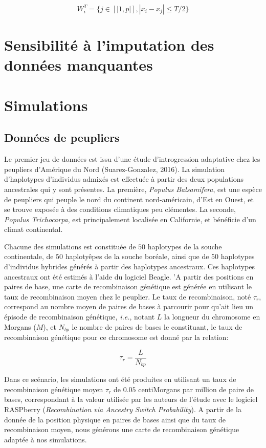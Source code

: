 \documentclass[12pt,twoside]{reedthesis}
\theoremstyle{definition}
\theoremstyle{definition}
\theoremstyle{remark}
\begin{document}
  \[W_i^T = \{ j \in [|1, p|], |x_i - x_j| \leq T/2 \}\]
  
  \section{Sensibilité à l'imputation des données
  manquantes}\label{sensibilite-a-limputation-des-donnees-manquantes}
  
  \section{Simulations}\label{simulations}
  
  \subsection{Données de peupliers}\label{donnees-de-peupliers}
  
  Le premier jeu de données est issu d'une étude d'introgression
  adaptative chez les peupliers d'Amérique du Nord (Suarez-Gonzalez,
  2016). La simulation d'haplotypes d'individus admixés est effectuée à
  partir des deux populations ancestrales qui y sont présentes. La
  première, \emph{Populus Balsamifera}, est une espèce de peupliers qui
  peuple le nord du continent nord-américain, d'Est en Ouest, et se trouve
  exposée à des conditions climatiques peu clémentes. La seconde,
  \emph{Populus Trichocarpa}, est principalement localisée en Californie,
  et bénéficie d'un climat continental.
  
  Chacune des simulations est constituée de \(50\) haplotypes de la souche
  continentale, de \(50\) haplotyêpes de la souche boréale, ainsi que de
  \(50\) haplotypes d'individus hybrides générés à partir des haplotypes
  ancestraux. Ces haplotypes ancestraux ont été estimés à l'aide du
  logiciel Beagle. 'A partir des positions en paires de base, une carte de
  recombinaison génétique est générée en utilisant le taux de
  recombinaison moyen chez le peuplier. Le taux de recombinaison, noté
  \(\tau_r\), correspond au nombre moyen de paires de bases à parcourir
  pour qu'ait lieu un épisode de recombinaison génétique, \emph{i.e.},
  notant \(L\) la longueur du chromosome en Morgans (\(M\)), et \(N_{bp}\)
  le nombre de paires de bases le constituant, le taux de recombinaison
  génétique pour ce chromosome est donné par la relation:
  
  \[\tau_r = \frac{L}{N_{bp}}\]
  
  Dans ce scénario, les simulations ont été produites en utilisant un taux
  de recombinaison génétique moyen \(\tau_r\) de \(0.05\) centiMorgans par
  million de paire de bases, correspondant à la valeur utilisée par les
  auteurs de l'étude avec le logiciel RASPberry
  (\textit{Recombination via Ancestry Switch Probability}). A partir de la
  donnée de la position physique en paires de bases ainsi que du taux de
  recombinaison moyen, nous générons une carte de recombinaison génétique
  adaptée à nos simulations.
  
\end{document}

